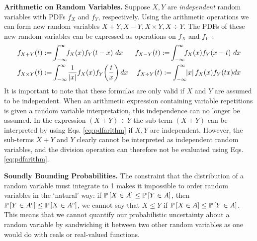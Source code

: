 \noindent \textbf{Arithmetic on Random Variables.}%
 Suppose $X,Y$ are \emph{independent} random variables with PDFs $f_X$ and $f_Y$, respectively.  
Using the arithmetic operations we can form new random variables $X+Y, X-Y, X\times Y, X\div Y$. The PDFs of these new random variables can be expressed as operations on $f_X$ and $f_Y$~\cite{springer1979algebra}:
\begin{align}
&f_{X+Y}(t)\mathrel{:=}\hspace{-1pt}\int_{-\infty}^{\infty} \hspace{-3pt}f_X(x)f_Y(t-x)~dx &
f_{X-Y}(t)\mathrel{:=}\hspace{-1pt}\int_{-\infty}^{\infty} \hspace{-3pt}f_X(x)f_Y(x-t)~dx\nonumber \\
&f_{X\times Y}(t)\mathrel{:=}\hspace{-1pt}\int_{-\infty}^{\infty}\hspace{-1pt} \frac{1}{\left\lvert x\right\rvert}f_X(x)f_Y\hspace{-2pt}\left(\frac{t}{x}\right)dx &
f_{X\div Y}(t)\mathrel{:=}\hspace{-1pt}\int_{-\infty}^{\infty} \hspace{-3pt}\left\lvert x\right\rvert f_X(x)f_Y(tx)dx\label{eq:pdfarithm}
\end{align}
It is important to note that these formulas are only valid if $X$ and $Y$ are assumed to be independent.
When an arithmetic expression containing variable repetitions is given a random variable interpretation, this independence can no longer be assumed.  In the expression $(X+Y)\div Y$ the sub-term $(X+Y)$ can be interpreted by using Eqs.  \eqref{eq:pdfarithm} if $X,Y$ are independent. However, the sub-terms $X+Y$ and $Y$ clearly cannot be interpreted as independent random variables, and the division operation can therefore not be evaluated using Eqs.  \eqref{eq:pdfarithm}. 

\noindent\textbf{Soundly Bounding Probabilities.} %
The constraint that the distribution of a random variable must integrate to 1 makes it impossible to order random variables in the `natural' way: if $\mathbb{P}\left[ X\in A \right]\leq \mathbb{P}\left[ Y\in A \right]$, then $\mathbb{P}\left[ Y\in A^c \right]\leq \mathbb{P}\left[ X\in A^c \right]$, \ie we cannot say that $X\leq Y$ if $\mathbb{P}\left[ X\in A \right]\leq \mathbb{P}\left[ Y\in A \right]$.
This means that we cannot 
quantify our probabilistic uncertainty about a random variable by sandwiching it between two other random variables as one would do with reals or real-valued functions.

